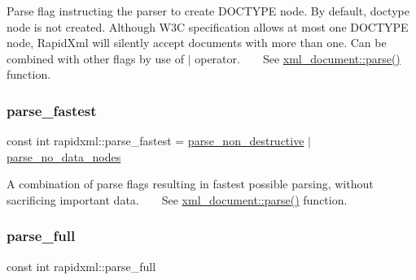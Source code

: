 Parse flag instructing the parser to create D\+O\+C\+T\+Y\+PE node. By default, doctype node is not created. Although W3C specification allows at most one D\+O\+C\+T\+Y\+PE node, Rapid\+Xml will silently accept documents with more than one. Can be combined with other flags by use of $\vert$ operator. ~\newline
~\newline
 See \mbox{\hyperlink{classrapidxml_1_1xml__document_ac6e73ff9ac323bf5a370c38feb03a6b1}{xml\+\_\+document\+::parse()}} function. \mbox{\label{namespacerapidxml_a64da06dfdab7c86ca954bda4fecb978f}} 
\subsubsection{\texorpdfstring{parse\_fastest}{parse\_fastest}}
{\footnotesize\ttfamily const int rapidxml\+::parse\+\_\+fastest = \mbox{\hyperlink{namespacerapidxml_a45d4d8fef551beaaba23a83b847fd6a3}{parse\+\_\+non\+\_\+destructive}} $\vert$ \mbox{\hyperlink{namespacerapidxml_ac2d21ef14a4e8936b94aca5d38b1a74d}{parse\+\_\+no\+\_\+data\+\_\+nodes}}}

A combination of parse flags resulting in fastest possible parsing, without sacrificing important data. ~\newline
~\newline
 See \mbox{\hyperlink{classrapidxml_1_1xml__document_ac6e73ff9ac323bf5a370c38feb03a6b1}{xml\+\_\+document\+::parse()}} function. \mbox{\label{namespacerapidxml_abb48dc65db75d9e49734bc5bd2fabbfc}} 
\subsubsection{\texorpdfstring{parse\_full}{parse\_full}}
{\footnotesize\ttfamily const int rapidxml\+::parse\+\_\+full}

